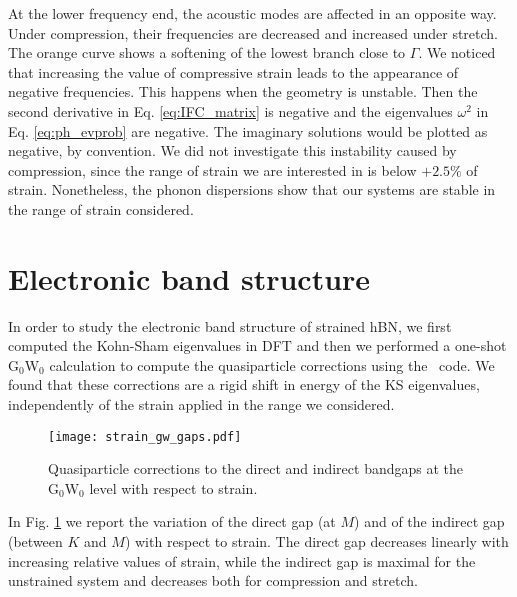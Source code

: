 At the lower frequency end, the acoustic modes are affected in an opposite way. Under compression, their frequencies are decreased and increased under stretch. The orange curve shows a softening of the lowest branch close to $\Gamma$. We noticed that increasing the value of compressive strain leads to the appearance of negative frequencies. This happens when the geometry is unstable. Then the second derivative in Eq. \eqref{eq:IFC_matrix} is negative and the eigenvalues $\omega^2$ in Eq. \eqref{eq:ph_evprob} are negative. The imaginary solutions would be plotted as negative, by convention. We did not investigate this instability caused by compression, since the range of strain we are interested in is below $+2.5\%$ of strain. Nonetheless, the phonon dispersions show that our systems are stable in the range of strain considered.

%
\section{Electronic band structure}
In order to study the electronic band structure of strained hBN, we first computed the Kohn-Sham eigenvalues in \acrshort{DFT} and then we performed a one-shot G$_0$W$_0$ calculation to compute the quasiparticle corrections using the \yambo~code.\cite{Sangalli_2019} We found that these corrections are a rigid shift in energy of the KS eigenvalues, independently of the strain applied in the range we considered. 
\begin{figure}[tbp]
	\vspace{0.5cm}
	\setcapindent{2em}
	\centering
	\texttt{[image: strain\_gw\_gaps.pdf]}
	\caption{Quasiparticle corrections to the direct and indirect bandgaps at the G$_0$W$_0$ level with respect to strain.}
	\label{fig:strain_gw_gaps}
\end{figure}
In Fig. \ref{fig:strain_gw_gaps} we report the variation of the direct gap (at $M$) and of the indirect gap (between $K$ and $M$) with respect to strain. The direct gap decreases linearly with increasing relative values of strain, while the indirect gap is maximal for the unstrained system and decreases both for compression and stretch.

